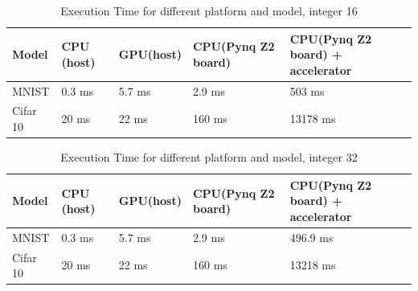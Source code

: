 \begin{center}
\begin{table}[!htbp]
\centering
\captionsetup{justification=centering}
\begin{tabular}{ |p{2.5cm}||p{2.5cm}|p{2.5cm}|p{2.5cm}|p{2.5cm}| }
\hline
Model & CPU (host)\protect\footnotemark[1] & GPU(host)\protect\footnotemark[2] & CPU(Pynq Z2 board)\protect\footnotemark[3] & CPU(Pynq Z2 board) + accelerator \\
\hline
MNIST & 0.3 ms & 5.7 ms & 2.9 ms  &  503 ms
\\
\hline
Cifar 10& 20 ms & 22 ms& 160 ms & 13178 ms 
\\
\hline
\end{tabular}
\caption{Execution Time for different platform and model, integer 16}
\label{table:moplatint16}
\end{table}
\end{center}
\begin{center}
\begin{table}[!htbp]
\centering
\captionsetup{justification=centering}
\begin{tabular}{ |p{2.5cm}||p{2.5cm}|p{2.5cm}|p{2.5cm}|p{2.5cm}| }
\hline
Model & CPU (host)\protect\footnotemark[1] & GPU(host)\protect\footnotemark[2] & CPU(Pynq Z2 board)\protect\footnotemark[3] & CPU(Pynq Z2 board) + accelerator \\
\hline
MNIST & 0.3 ms & 5.7 ms & 2.9 ms  & 496.9 ms
\\
\hline
Cifar 10& 20 ms & 22 ms& 160 ms & 13218 ms
\\
\hline
\end{tabular}
\caption{Execution Time for different platform and model, integer 32}
\label{table:moplatint32}
\end{table}
\end{center}

